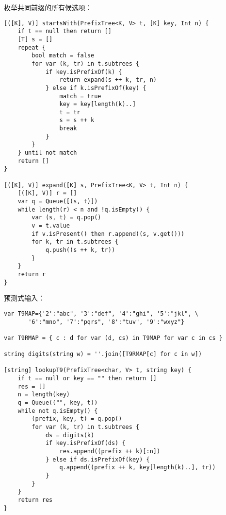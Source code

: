 \documentclass[b5paper]{ctexart}
\begin{document}
枚举共同前缀的所有候选项：

\begin{lstlisting}[language = Bourbaki]
[([K], V)] startsWith(PrefixTree<K, V> t, [K] key, Int n) {
    if t == null then return []
    [T] s = []
    repeat {
        bool match = false
        for var (k, tr) in t.subtrees {
            if key.isPrefixOf(k) {
                return expand(s ++ k, tr, n)
            } else if k.isPrefixOf(key) {
                match = true
                key = key[length(k)..]
                t = tr
                s = s ++ k
                break
            }
        }
    } until not match
    return []
}

[([K], V)] expand([K] s, PrefixTree<K, V> t, Int n) {
    [([K], V)] r = []
    var q = Queue([(s, t)])
    while length(r) < n and !q.isEmpty() {
        var (s, t) = q.pop()
        v = t.value
        if v.isPresent() then r.append((s, v.get()))
        for k, tr in t.subtrees {
            q.push((s ++ k, tr))
        }
    }
    return r
}
\end{lstlisting}

预测式输入：
\begin{lstlisting}[language = Bourbaki]
var T9MAP={'2':"abc", '3':"def", '4':"ghi", '5':"jkl", \
       '6':"mno", '7':"pqrs", '8':"tuv", '9':"wxyz"}

var T9RMAP = { c : d for var (d, cs) in T9MAP for var c in cs }

string digits(string w) = ''.join([T9RMAP[c] for c in w])

[string] lookupT9(PrefixTree<char, V> t, string key) {
    if t == null or key == "" then return []
    res = []
    n = length(key)
    q = Queue(("", key, t))
    while not q.isEmpty() {
        (prefix, key, t) = q.pop()
        for var (k, tr) in t.subtrees {
            ds = digits(k)
            if key.isPrefixOf(ds) {
                res.append((prefix ++ k)[:n])
            } else if ds.isPrefixOf(key) {
                q.append((prefix ++ k, key[length(k)..], tr))
            }
        }
    }
    return res
}
\end{lstlisting}
\end{document}

